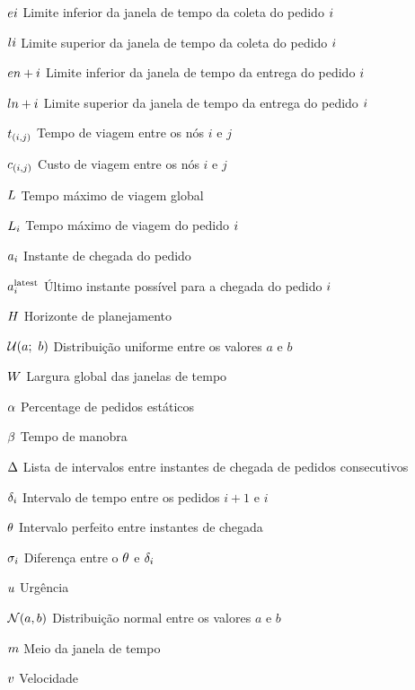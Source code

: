 \begin{simbolos}
    \item[$e{i}$]
      Limite inferior da janela de tempo da coleta do pedido $i$
    \item[$l{i}$]
      Limite superior da janela de tempo da coleta do pedido $i$
    \item[$e{n + i}$]
      Limite inferior da janela de tempo da entrega do pedido $i$
    \item[$l{n + i}$]
      Limite superior da janela de tempo da entrega do pedido $i$
    \item[$t_{(i,j)}$] Tempo de viagem entre os nós $i$ e $j$
    \item[$c_{(i,j)}$] Custo de viagem entre os nós $i$ e $j$
    \item[$L$] Tempo máximo de viagem global
    \item[$L_i$] Tempo máximo de viagem do pedido 
      $i$
    \item[$a_i$] Instante de chegada do pedido \request
    \item[$a{}_{i{}}^{\mathrm{latest}}$]
      Último instante possível para a chegada do pedido $i$
    \item[$H$] Horizonte de planejamento
    \item[$\mathcal{U}(a;\ b)$]
      Distribuição uniforme entre os valores $a$ e $b$
    \item[$W$] Largura global das janelas de tempo 
    \item[$\alpha$] Percentage de pedidos estáticos
    \item[$\beta$] Tempo de manobra
    \item[$\Delta$]
      Lista de intervalos entre instantes de chegada de pedidos 
      consecutivos
    \item[$\delta_i$]
      Intervalo de tempo entre os pedidos $i + 1$ e $i$
    \item[$\theta$] Intervalo perfeito entre instantes de chegada
    \item[$\sigma_i$]
      Diferença entre o $\theta$ e 
      $\delta_i$
    \item[$u$] Urgência
    \item[$\mathcal{N}(a,b)$]
       Distribuição normal entre os valores $a$ e $b$
    \item[$m$] Meio da janela de tempo
    \item[$v$] Velocidade
\end{simbolos}
